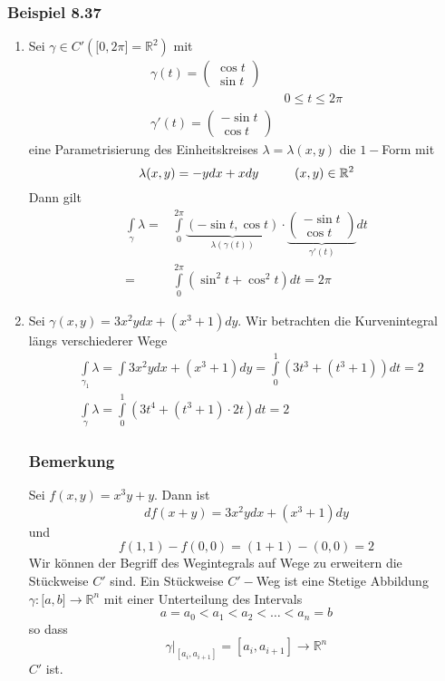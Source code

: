 \subsubsection*{Beispiel 8.37}
\begin{enumerate}
\item Sei $\gamma\in C'\left(\lbrack 0,2\pi\rbrack =\mathbb{R}^2\right)$ mit 
\[\begin{array}{*{20}{c}}
{\gamma (t) = \left( {\begin{array}{*{20}{c}}
{\cos t}\\
{\sin t}
\end{array}} \right)}&{}\\
{}&{0 \le t \le 2\pi }\\
{\gamma '(t) = \left( {\begin{array}{*{20}{c}}
{ - \sin t}\\
{\cos t}
\end{array}} \right)}&{}
\end{array}\]
eine Parametrisierung des Einheitskreises $\lambda = \lambda (x,y)$ die $1-$Form mit $$\lambda (x,y)=-ydx+xdy\hspace{10mm}(x,y)\in\mathbb{R}^2$$
Dann gilt 
\begin{align*}
\int\limits_\gamma  \lambda   = &\int\limits_0^{2\pi } {\underbrace {\left( { - \sin t,\cos t} \right)}_{\lambda (\gamma (t))} \cdot \underbrace {\left( {\begin{array}{*{20}{c}}
{ - \sin t}\\
{\cos t}
\end{array}} \right)}_{\gamma '(t)}dt} \\
= &\int\limits_0^{2\pi } {\left( {{{\sin }^2}t + {{\cos }^2}t} \right)dt}  = 2\pi 
\end{align*}
\item Sei $\gamma (x,y)=3x^2ydx + \left( x^3+1\right)dy$. Wir betrachten die Kurvenintegral längs verschiederer Wege
\begin{align*}
&\int\limits_{{\gamma _1}} \lambda   = \int {3{x^2}ydx + \left( {{x^3} + 1} \right)dy}  = \int\limits_0^1 {\left( {3{t^3} + \left( {{t^3} + 1} \right)} \right)dt = 2}\\
&\int\limits_\gamma  \lambda   = \int\limits_0^1 {\left( {3{t^4} + \left( {{t^3} + 1} \right) \cdot 2t} \right)dt = 2}  
\end{align*}
\subsubsection*{Bemerkung}
Sei $f(x,y)=x^3y+y$. Dann ist  $$df(x+y)=3x^2ydx+\left( x^3+1\right) dy$$ und $$f(1,1)-f(0,0)=(1+1)-(0,0)=2$$
Wir können der Begriff des Wegintegrals auf Wege zu erweitern die Stückweise $C'$ sind. Ein Stückweise $C'-$Weg ist eine Stetige Abbildung $\gamma :\lbrack a,b\rbrack\rightarrow\mathbb{R}^n$ mit einer Unterteilung des Intervals 
$$a=a_0 < a_1 < a_2 < \dots <a_n = b$$ 
so dass \[{\left. \gamma  \right|_{\left[ {{a_i},{a_{i + 1}}} \right]}} = \left[ {{a_i},{a_{i + 1}}} \right] \to \mathbb{R}^n \] $C'$ ist.\\


\end{enumerate}
